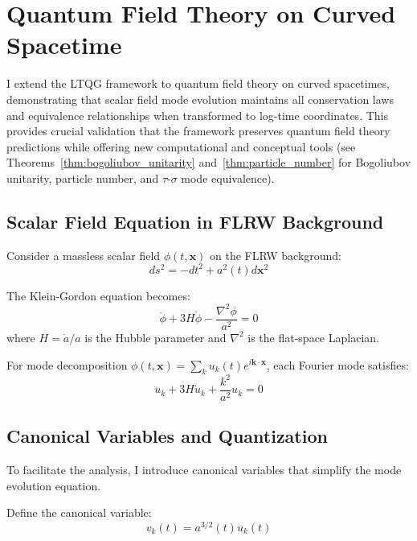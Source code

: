 \section{Quantum Field Theory on Curved Spacetime}
\label{sec:qft}

I extend the LTQG framework to quantum field theory on curved spacetimes, demonstrating that scalar field mode evolution maintains all conservation laws and equivalence relationships when transformed to log-time coordinates. This provides crucial validation that the framework preserves quantum field theory predictions while offering new computational and conceptual tools (see Theorems~\ref{thm:bogoliubov_unitarity} and~\ref{thm:particle_number} for Bogoliubov unitarity, particle number, and $\tau$-$\sigma$ mode equivalence).

\subsection{Scalar Field Equation in FLRW Background}
\label{subsec:scalar_field_flrw}

Consider a massless scalar field $\phi(t,\mathbf{x})$ on the FLRW background:
\begin{equation}
ds^2 = -dt^2 + a^2(t) d\mathbf{x}^2
\end{equation}

The Klein-Gordon equation becomes:
\begin{equation}
\ddot{\phi} + 3H\dot{\phi} - \frac{\nabla^2\phi}{a^2} = 0
\label{eq:klein_gordon_flrw}
\end{equation}
where $H = \dot{a}/a$ is the Hubble parameter and $\nabla^2$ is the flat-space Laplacian.

For mode decomposition $\phi(t,\mathbf{x}) = \sum_k u_k(t) e^{i\mathbf{k} \cdot \mathbf{x}}$, each Fourier mode satisfies:
\begin{equation}
\ddot{u}_k + 3H\dot{u}_k + \frac{k^2}{a^2} u_k = 0
\label{eq:mode_equation_tau}
\end{equation}

\subsection{Canonical Variables and Quantization}
\label{subsec:canonical_variables}

To facilitate the analysis, I introduce canonical variables that simplify the mode evolution equation.

\begin{definition}
Define the canonical variable:
\begin{equation}
v_k(t) = a^{3/2}(t) u_k(t)
\label{eq:canonical_variable}
\end{equation}
\end{definition}

